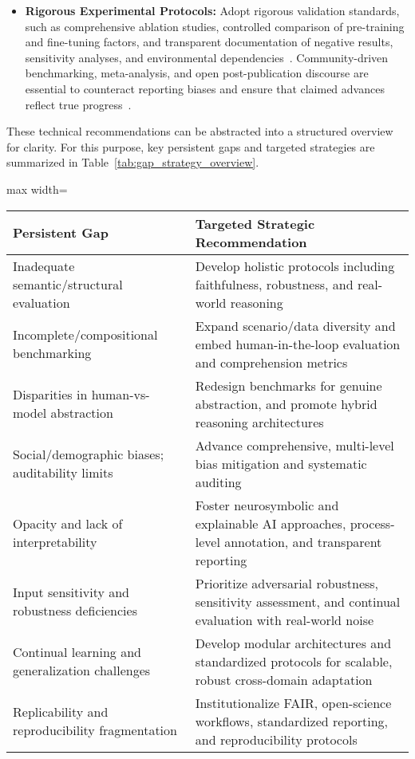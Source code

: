 \begin{itemize}
    \item \textbf{Rigorous Experimental Protocols:} Adopt rigorous validation standards, such as comprehensive ablation studies, controlled comparison of pre-training and fine-tuning factors, and transparent documentation of negative results, sensitivity analyses, and environmental dependencies~\cite{ref9,ref10,ref55,ref59,ref61,ref62,ref66,ref74,ref90,ref104,ref105,ref106,ref107,ref108}. Community-driven benchmarking, meta-analysis, and open post-publication discourse are essential to counteract reporting biases and ensure that claimed advances reflect true progress~\cite{ref22,ref45,ref55,ref61,ref88,ref101,ref106,ref107,ref108}.
\end{itemize}

These technical recommendations can be abstracted into a structured overview for clarity. For this purpose, key persistent gaps and targeted strategies are summarized in Table~\ref{tab:gap_strategy_overview}.

\begin{table*}[htbp]
\centering
\caption{Mapping of Persistent Gaps to Targeted Strategic Recommendations}
\label{tab:gap_strategy_overview}
\begin{adjustbox}{max width=\textwidth}
\begin{tabular}{ll}
\toprule
\textbf{Persistent Gap} & \textbf{Targeted Strategic Recommendation} \\
\midrule
Inadequate semantic/structural evaluation & Develop holistic protocols including faithfulness, robustness, and real-world reasoning \\
Incomplete/compositional benchmarking & Expand scenario/data diversity and embed human-in-the-loop evaluation and comprehension metrics \\
Disparities in human-vs-model abstraction & Redesign benchmarks for genuine abstraction, and promote hybrid reasoning architectures \\
Social/demographic biases; auditability limits & Advance comprehensive, multi-level bias mitigation and systematic auditing \\
Opacity and lack of interpretability & Foster neurosymbolic and explainable AI approaches, process-level annotation, and transparent reporting \\
Input sensitivity and robustness deficiencies & Prioritize adversarial robustness, sensitivity assessment, and continual evaluation with real-world noise \\
Continual learning and generalization challenges & Develop modular architectures and standardized protocols for scalable, robust cross-domain adaptation \\
Replicability and reproducibility fragmentation & Institutionalize FAIR, open-science workflows, standardized reporting, and reproducibility protocols \\
\bottomrule
\end{tabular}
\end{adjustbox}
\end{table*}

